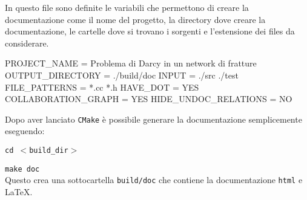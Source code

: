 \noindent In questo file sono definite le variabili che permettono di creare la documentazione come il nome del progetto, la directory dove creare la documentazione, le cartelle dove si trovano i sorgenti e l'estensione dei files da considerare.

\begin{Code03_01}
PROJECT_NAME 				=	 Problema di Darcy in un network di fratture
OUTPUT_DIRECTORY			=	./build/doc
INPUT						= 	./src ./test
FILE_PATTERNS				= 	*.cc *.h
HAVE_DOT					=	YES
COLLABORATION_GRAPH		=	YES
HIDE_UNDOC_RELATIONS		=	NO
\end{Code03_01}

\noindent Dopo aver lanciato \texttt{CMake} è possibile generare la documentazione semplicemente eseguendo: \\
\par \texttt{cd $<$build\_dir$>$} 
\par \texttt{make doc} \\

\noindent Questo crea una sottocartella \texttt{build/doc} che contiene la documentazione \texttt{html} e \LaTeX{}.